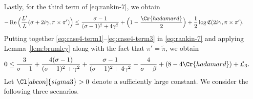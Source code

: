 \documentclass[12pt,reqno]{amsart}
\renewcommand{\tilde}{\widetilde}
\theoremstyle{remark}
\renewcommand{\tilde}{\widetilde}
\DeclareMathOperator{\Real}{Re}
\renewcommand{\tilde}{\widetilde}
\newcommand{\Q}{\mathbb{Q}}
\numberwithin{equation}{section}
\begin{document}
	Lastly, for the third term of \eqref{eq:rankin-7}, we obtain
	\begin{equation}\label{eq:case4-term3}
		\begin{aligned}
			-\Real\Big(\frac{L'}{L}(\sigma + 2i\gamma, \pi \times \pi') \Big) &\le  \frac{\sigma-1}{(\sigma-1)^2+4\gamma^2} +\Big(1-\frac{\Cr{hadamard}}{2}\Big)+ \frac{1}{2}\log \mathfrak{C}(2i\gamma, \pi \times \pi').
		\end{aligned}
	\end{equation}
	Putting together \eqref{eq:case4-term1}--\eqref{eq:case4-term3} in \eqref{eq:rankin-7} and applying Lemma~\ref{lem:brumley} along with the fact that $\pi' = \tilde{\pi}$, we obtain
	\begin{equation}
		\label{eq:rankin-9}
		0 \le \frac{3}{\sigma-1} +\frac{4(\sigma-1)}{(\sigma-1)^2+\gamma^2} + \frac{\sigma-1}{(\sigma-1)^2+4\gamma^2}  -\frac{4}{\sigma-\beta}
        +  (8-4\Cr{hadamard}) + \mathcal{L}_3.  %
	\end{equation}
    Let $\Cl[abcon]{sigma3}>0$ denote a sufficiently large constant. %
    We consider the following three scenarios.
\end{document}

